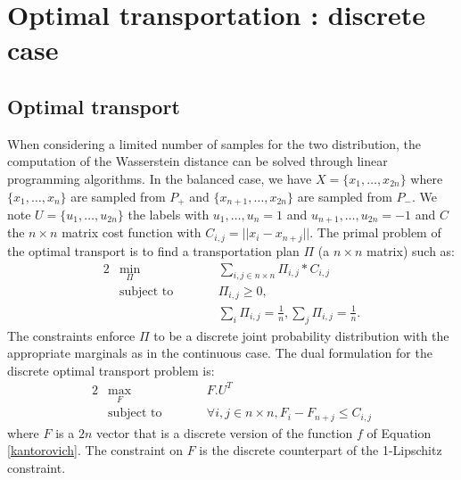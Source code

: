 


\newpage
\appendix

\section{Optimal transportation : discrete case}
\subsection{Optimal transport}
\label{secOptTransp}
When considering a limited number of samples for the two distribution, the computation of the Wasserstein distance 
can be solved through linear programming algorithms. In the balanced case, we have $X=\{x_1, \ldots, x_{2n}\}$ where $\{x_1,\ldots,x_n\}$ are sampled from $P_+$ and  $\{x_{n+1},\ldots,x_{2n}\}$ are sampled from $P_-$. We note $U=\{u_1, \ldots, u_{2n}\}$ the labels with $u_1,\ldots,u_n=1$ and $u_{n+1},\ldots,u_{2n}=-1$ and $C$ the $n\times n$ matrix cost function with $C_{i,j}=||x_i-x_{n+j}||$. The primal problem of the optimal transport is to find a transportation plan $\Pi$ (a $n\times n$ matrix) such as:
\begin{alignat}{2}
&\!\min_{\Pi}        &\qquad& \sum_{i,j \in n\times n}\Pi_{i,j}*C_{i,j}\\
&\text{subject to} &      & \Pi_{i,j} \geq 0,\\
&                  &      & \sum_i \Pi_{i,j} = \frac{1}{n},\sum_j \Pi_{i,j} = \frac{1}{n}.
\end{alignat}
The constraints enforce $\Pi$ to be a discrete joint probability distribution with the appropriate marginals as in the continuous case. The dual formulation for the discrete optimal transport problem is:
\begin{alignat}{2}
&\!\max_{F}        &\qquad& F.U^T\\
&\text{subject to} &      & \forall i,j \in n\times n, F_i-F_{n+j}\leq C_{i,j}
\end{alignat}
where $F$ is a $2n$ vector that is a discrete version of the function $f$ of Equation \ref{kantorovich}. The constraint on $F$ is the discrete counterpart of the 1-Lipschitz constraint. 

